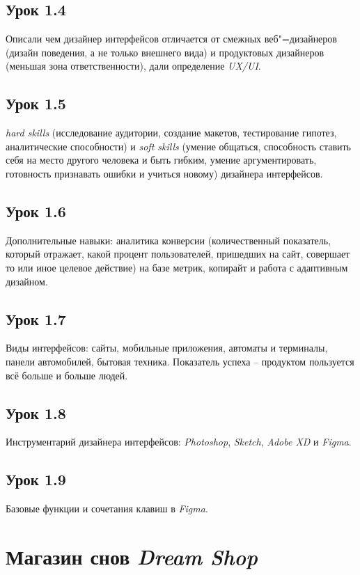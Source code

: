 \documentclass[variant=practice]{bsuir}
\begin{document}
\subsection{Урок 1.4} Описали чем дизайнер интерфейсов отличается от смежных
веб"=дизайнеров (дизайн поведения, а не только внешнего вида) и продуктовых
дизайнеров (меньшая зона ответственности), дали определение \textit{UX/UI}.

\subsection{Урок 1.5} \textit{hard skills} (исследование аудитории, создание
макетов, тестирование гипотез, аналитические способности) и \textit{soft skills}
(умение общаться, способность ставить себя на место другого человека и быть
гибким, умение аргументировать, готовность признавать ошибки и учиться новому)
дизайнера интерфейсов.

\subsection{Урок 1.6} Дополнительные навыки: аналитика конверсии (количественный
показатель, который отражает, какой процент пользователей, пришедших на сайт,
совершает то или иное целевое действие) на базе метрик, копирайт и работа с
адаптивным дизайном.

\subsection{Урок 1.7} Виды интерфейсов: сайты, мобильные приложения, автоматы и
терминалы, панели автомобилей, бытовая техника. Показатель успеха -- продуктом
пользуется всё больше и больше людей.

\subsection{Урок 1.8} Инструментарий дизайнера интерфейсов: \textit{Photoshop},
\textit{Sketch}, \textit{Adobe XD} и \textit{Figma}.

\subsection{Урок 1.9} Базовые функции и сочетания клавиш в \textit{Figma}.

\section{Магазин снов \textit{Dream Shop}}
\end{document}
